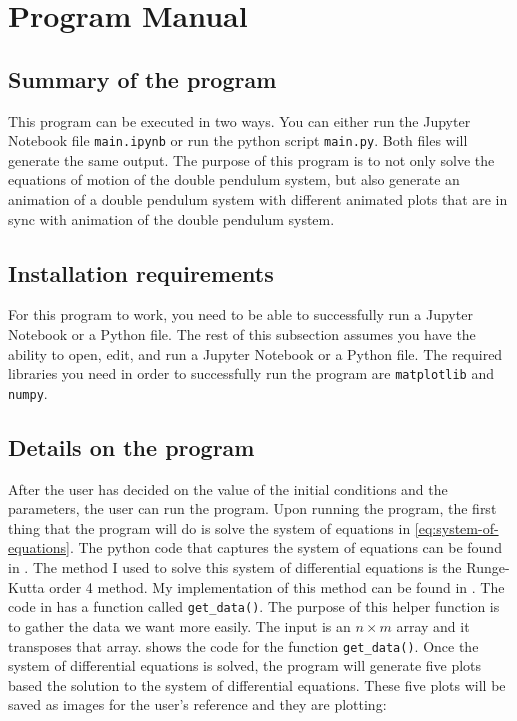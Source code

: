 \section{Program Manual}\label{sec:program-manual}

\subsection{Summary of the program}\label{subsec:summary-of-the-program}
This program can be executed in two ways. You can either run the Jupyter Notebook file \texttt{main.ipynb} or run the python script \texttt{main.py}. Both files will generate the same output. The purpose of this program is to not only solve the equations of motion of the double pendulum system, but also generate an animation of a double pendulum system with different animated plots that are in sync with animation of the double pendulum system.

\subsection{Installation requirements}\label{subsec:installation-requirements}
For this program to work, you need to be able to successfully run a Jupyter Notebook or a Python file. The rest of this subsection assumes you have the ability to open, edit, and run a Jupyter Notebook or a Python file. The required libraries you need in order to successfully run the program are \texttt{matplotlib} and \texttt{numpy}. 

\subsection{Details on the program}\label{subsec:details-on-the-program}
After the user has decided on the value of the initial conditions and the parameters, the user can run the program. Upon running the program, the first thing that the program will do is solve the system of equations in \eqref{eq:system-of-equations}. The python code that captures the system of equations can be found in . The method I used to solve this system of differential equations is the Runge-Kutta order 4 method. My implementation of this method can be found in . The code in  has a function called \verb|get_data()|. The purpose of this helper function is to gather the data we want more easily. The input is an $n \times m$ array and it transposes that array.  shows the code for the function \verb|get_data()|. Once the system of differential equations is solved, the program will generate five plots based the solution to the system of differential equations. These five plots will be saved as images for the user's reference and they are plotting:

